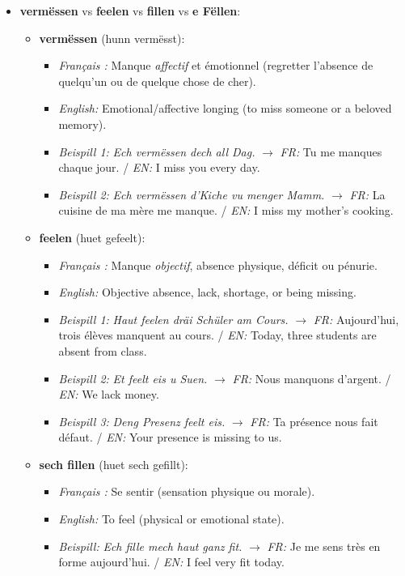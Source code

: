 \begin{itemize}
    \vspace{0.6em}

    \item \textbf{vermëssen} vs \textbf{feelen} vs \textbf{fillen} vs \textbf{e Fëllen}:
    \begin{itemize}
        \item \textbf{vermëssen} (hunn vermësst):
        \begin{itemize}
            \item \textit{Français :} Manque \textit{affectif} et émotionnel (regretter l'absence de quelqu'un ou de quelque chose de cher).
            \item \textit{English:} Emotional/affective longing (to miss someone or a beloved memory).
            \item \textit{Beispill 1:} \textit{Ech vermëssen dech all Dag.} $\rightarrow$ \textit{FR:} Tu me manques chaque jour. / \textit{EN:} I miss you every day.
            \item \textit{Beispill 2:} \textit{Ech vermëssen d'Kiche vu menger Mamm.} $\rightarrow$ \textit{FR:} La cuisine de ma mère me manque. / \textit{EN:} I miss my mother's cooking.
        \end{itemize}

        \item \textbf{feelen} (huet gefeelt):
        \begin{itemize}
            \item \textit{Français :} Manque \textit{objectif}, absence physique, déficit ou pénurie.
            \item \textit{English:} Objective absence, lack, shortage, or being missing.
            \item \textit{Beispill 1:} \textit{Haut feelen dräi Schüler am Cours.} $\rightarrow$ \textit{FR:} Aujourd'hui, trois élèves manquent au cours. / \textit{EN:} Today, three students are absent from class.
            \item \textit{Beispill 2:} \textit{Et feelt eis u Suen.} $\rightarrow$ \textit{FR:} Nous manquons d'argent. / \textit{EN:} We lack money.
            \item \textit{Beispill 3:} \textit{Deng Presenz feelt eis.} $\rightarrow$ \textit{FR:} Ta présence nous fait défaut. / \textit{EN:} Your presence is missing to us.
        \end{itemize}

        \item \textbf{sech fillen} (huet sech gefillt):
        \begin{itemize}
            \item \textit{Français :} Se sentir (sensation physique ou morale).
            \item \textit{English:} To feel (physical or emotional state).
            \item \textit{Beispill:} \textit{Ech fille mech haut ganz fit.} $\rightarrow$ \textit{FR:} Je me sens très en forme aujourd'hui. / \textit{EN:} I feel very fit today.
        \end{itemize}


\end{itemize}
\end{itemize}
